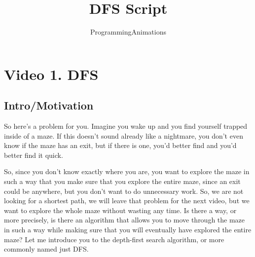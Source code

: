 \documentclass[12pt]{article}
\author{ProgrammingAnimations}
\title{DFS Script}
\date{}
\begin{document}
\maketitle


\section{Video 1. DFS}

\subsection{Intro/Motivation}

So here's a problem for you.
Imagine you wake up and you find yourself trapped inside of a maze.
If this doesn't sound already like a nightmare,
you don't even know if the maze has an 
exit, but if there is one, you'd better find and you'd better
find it quick.

So, since you don't know exactly where
you are, you want to explore the maze in such a way
that you make sure that you explore the entire maze,
since an exit could be anywhere, but you don't want to
do unnecessary work. So, we are not looking for a shortest
path, we will leave that problem for the next video,
but we want to explore the whole maze without
wasting any time. Is there a way, or more
precisely, is there an algorithm that allows you to move
through the maze in such a way while making sure that
you will eventually have explored the entire maze?
Let me introduce you to the depth-first search algorithm,
or more commonly named just DFS.
\end{document}
